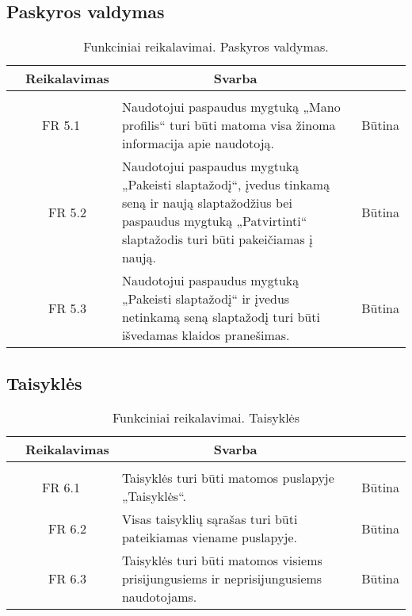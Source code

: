 \documentclass{VUMIFPSkursinis}
\begin{document}
\subsection{Paskyros valdymas}

\begin{table}[H]
	\caption{Funkciniai reikalavimai. Paskyros valdymas.}
	\begin{tabular}{|p{1cm}|p{1cm}|p{}|p{}|}
		\hline 
		\rowcolor{gray!50}
		\multicolumn{2}{|c|}{{\bfseries Kodas}}&
		\multicolumn{1}{c|}{{\bfseries Reikalavimas}}&
		\multicolumn{1}{c|}{{\bfseries Svarba}}\\
		\hline
		\rowcolor{lightgray}
		\multicolumn{4}{|c|}{Paskyros valdymas}\\				
		\hline
		\multicolumn{2}{|c|}{FR 5.1}&
		{Naudotojui paspaudus mygtuką „Mano profilis“ turi būti matoma visa žinoma informacija apie naudotoją.
		}&		
		\multicolumn{1}{c|}{Būtina}\\
		\hline
		\multicolumn{1}{|c}{}&
		\multicolumn{1}{c|}{FR 5.2}&
		{Naudotojui paspaudus mygtuką „Pakeisti slaptažodį“, įvedus tinkamą seną ir naują slaptažodžius bei paspaudus mygtuką „Patvirtinti“ slaptažodis turi būti pakeičiamas į naują.
		}&		
		\multicolumn{1}{c|}{Būtina}\\
		\hline
		\multicolumn{1}{|c}{}&
		\multicolumn{1}{c|}{FR 5.3}&
		{Naudotojui paspaudus mygtuką „Pakeisti slaptažodį“ ir įvedus netinkamą seną slaptažodį turi būti išvedamas klaidos pranešimas.
		}&
		\multicolumn{1}{c|}{Būtina}\\	
		\hline		
	\end{tabular}		
\end{table}

\subsection{Taisyklės}
\begin{table}[H]
	\caption{Funkciniai reikalavimai. Taisyklės}
	\begin{tabular}{|p{1cm}|p{1cm}|p{}|p{}|}
		\hline 
		\rowcolor{gray!50}
		\multicolumn{2}{|c|}{{\bfseries Kodas}}&
		\multicolumn{1}{c|}{{\bfseries Reikalavimas}}&
		\multicolumn{1}{c|}{{\bfseries Svarba}}\\
		\hline
		\rowcolor{lightgray}
		\multicolumn{4}{|c|}{Taisyklės}\\		
		
		\hline
		\multicolumn{2}{|c|}{FR 6.1}&
		{Taisyklės turi būti matomos puslapyje „Taisyklės“.
		}&		
		\multicolumn{1}{c|}{Būtina}\\
		\hline
		\multicolumn{1}{|c}{}&
		\multicolumn{1}{c|}{FR 6.2}&
		{Visas taisyklių sąrašas turi būti pateikiamas viename puslapyje.
		}&		
		\multicolumn{1}{c|}{Būtina}\\
		\hline	
		\multicolumn{1}{|c}{}&
		\multicolumn{1}{c|}{FR 6.3}&
		{Taisyklės turi būti matomos visiems prisijungusiems ir neprisijungusiems naudotojams.
		}&
		\multicolumn{1}{c|}{Būtina}\\									
		\hline
	\end{tabular}		
\end{table}
\end{document}
